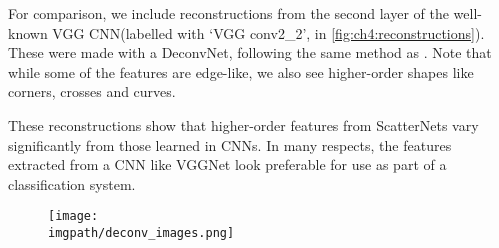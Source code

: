 {For comparison, we include reconstructions from the second layer of the
well-known VGG CNN\@ (labelled with `VGG conv2\_2', in
\autoref{fig:ch4:reconstructions}). These were made with a DeconvNet, following the
same method as \cite{zeiler_visualizing_2014}. Note that while some of
the features are edge-like, we also see higher-order shapes like corners,
crosses and curves.

These reconstructions show that higher-order features from ScatterNets vary
significantly from those learned in CNNs. In many
respects, the features extracted from a CNN like VGGNet look preferable for use
as part of a classification system.
\begin{figure}[tp]
  \centering
  \texttt{[image: \\imgpath/deconv\_images.png]}
  \label{fig:ch4:reconstructions}
\end{figure}

}
